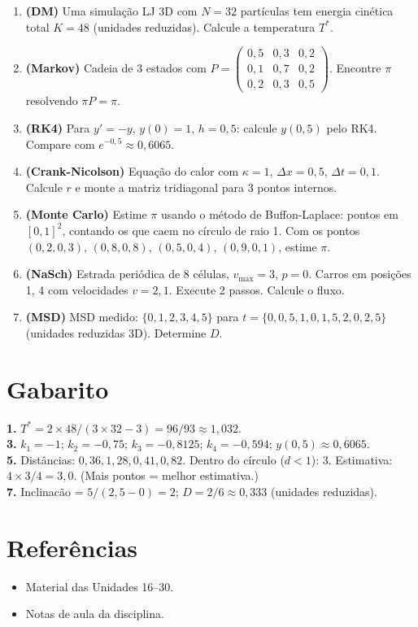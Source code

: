 \documentclass[12pt,a4paper]{article}
\begin{document}
\begin{enumerate}
  \item \textbf{(DM)} Uma simula\c{c}\~ao LJ 3D com $N=32$ part\'iculas tem energia cin\'etica total $K=48$ (unidades reduzidas). Calcule a temperatura $T^*$.
  
  \item \textbf{(Markov)} Cadeia de 3 estados com $P = \begin{pmatrix}0{,}5 & 0{,}3 & 0{,}2 \\ 0{,}1 & 0{,}7 & 0{,}2 \\ 0{,}2 & 0{,}3 & 0{,}5\end{pmatrix}$. Encontre $\pi$ resolvendo $\pi P = \pi$.
  
  \item \textbf{(RK4)} Para $y' = -y$, $y(0)=1$, $h=0{,}5$: calcule $y(0{,}5)$ pelo RK4. Compare com $e^{-0{,}5} \approx 0{,}6065$.
  
  \item \textbf{(Crank-Nicolson)} Equa\c{c}\~ao do calor com $\kappa=1$, $\Delta x=0{,}5$, $\Delta t=0{,}1$. Calcule $r$ e monte a matriz tridiagonal para 3 pontos internos.
  
  \item \textbf{(Monte Carlo)} Estime $\pi$ usando o m\'etodo de Buffon-Laplace: pontos em $[0,1]^2$, contando os que caem no c\'irculo de raio 1. Com os pontos $(0{,}2, 0{,}3)$, $(0{,}8, 0{,}8)$, $(0{,}5, 0{,}4)$, $(0{,}9, 0{,}1)$, estime $\pi$.
  
  \item \textbf{(NaSch)} Estrada peri\'odica de 8 c\'elulas, $v_\text{max}=3$, $p=0$. Carros em posi\c{c}\~oes 1, 4 com velocidades $v=2, 1$. Execute 2 passos. Calcule o fluxo.
  
  \item \textbf{(MSD)} MSD medido: $\{0, 1, 2, 3, 4, 5\}$ para $t = \{0, 0{,}5, 1{,}0, 1{,}5, 2{,}0, 2{,}5\}$ (unidades reduzidas 3D). Determine $D$.
\end{enumerate}

\section*{Gabarito}
\textbf{1.} $T^* = 2\times48/(3\times32-3) = 96/93 \approx 1{,}032$.\\
\textbf{3.} $k_1=-1$; $k_2=-0{,}75$; $k_3=-0{,}8125$; $k_4=-0{,}594$; $y(0{,}5)\approx0{,}6065$.\\
\textbf{5.} Dist\^ancias: $0{,}36, 1{,}28, 0{,}41, 0{,}82$. Dentro do c\'irculo ($d<1$): 3. Estimativa: $4\times3/4 = 3{,}0$. (Mais pontos = melhor estimativa.)\\
\textbf{7.} Inclinac\~ao = $5/(2{,}5-0) = 2$; $D = 2/6 \approx 0{,}333$ (unidades reduzidas).

\section*{Refer\^encias}
\begin{itemize}
  \item Material das Unidades 16--30.
  \item Notas de aula da disciplina.
\end{itemize}
\end{document}
